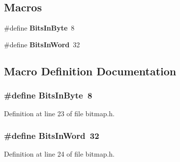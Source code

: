 \subsection*{Macros}
\begin{DoxyCompactItemize}
\item 
\#define {\bf Bits\+In\+Byte}~8
\item 
\#define {\bf Bits\+In\+Word}~32
\end{DoxyCompactItemize}


\subsection{Macro Definition Documentation}
\subsubsection[{Bits\+In\+Byte}]{\setlength{\rightskip}{0pt plus 5cm}\#define Bits\+In\+Byte~8}\label{bitmap_8h_aa9e2c5933951c57333f06c8dab6db241}


Definition at line 23 of file bitmap.\+h.

\subsubsection[{Bits\+In\+Word}]{\setlength{\rightskip}{0pt plus 5cm}\#define Bits\+In\+Word~32}\label{bitmap_8h_ad98bc578e39b73003f835343278c0284}


Definition at line 24 of file bitmap.\+h.

